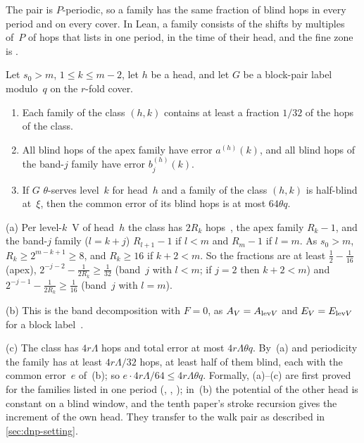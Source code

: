 The pair is $P$-periodic, so a family has the same fraction of blind hops in every period and on every cover. In Lean, a
family consists of the shifts by multiples of~$P$ of hops that  lists in one period, in the time of
their head, and the fine zone is .

\begin{lemma}\label{lem:dnp-family}
Let $s_0>m$, $1\le k\le m-2$, let $h$ be a head, and let $G$ be a block-pair label modulo~$q$ on the $r$-fold cover.
\begin{enumerate}[label=(\alph*)]
\item Each family of the class $(h,k)$ contains at least a fraction $1/32$ of the hops of the class.
\item All blind hops of the apex family have error $a^{(h)}(k)$, and all blind hops of the band-$j$ family have error
  $b^{(h)}_j(k)$.
\item If $G$ $\theta$-serves level~$k$ for head~$h$ and a family of the class $(h,k)$ is half-blind at~$\xi$, then the
  common error of its blind hops is at most $64\theta q$.
\end{enumerate}
\end{lemma}

\begin{outline}
(a) Per level-$k$~V of head~$h$ the class has $2R_k$ hops~\cite[Lemma~5.1(b)]{BoundedNesting2026}, the apex family
$R_k-1$, and the band-$j$ family ($l=k+j$) $R_{l+1}-1$ if $l<m$ and $R_m-1$ if $l=m$. As $s_0>m$, $R_k\ge2^{m-k+1}\ge8$, and
$R_k\ge16$ if $k+2<m$. So the fractions are at least $\frac12-\frac1{16}$ (apex), $2^{-j-2}-\frac1{2R_k}\ge\frac1{32}$
(band~$j$ with $l<m$; if $j=2$ then $k+2<m$) and $2^{-j-1}-\frac1{2R_k}\ge\frac1{16}$ (band~$j$ with $l=m$).

(b) This is the band decomposition with $F=0$, as $A_V=A_{\mathrm{lev} V}$ and $E_V=E_{\mathrm{lev} V}$ for a block
label~\cite[Definition~5.11]{BoundedNesting2026}.

(c) The class has $4r\Lambda$ hops and total error at most $4r\Lambda\theta q$. By~(a) and periodicity the family has at
least $4r\Lambda/32$ hops, at least half of them blind, each with the common error~$e$ of~(b); so
$e\cdot4r\Lambda/64\le4r\Lambda\theta q$.
Formally, (a)--(c) are first proved for the families listed in one period (,
, ); in~(b) the potential of the other
head is constant on a blind window, and the tenth paper's stroke recursion gives the increment of the own head. They
transfer to the walk pair as described in \cref{sec:dnp-setting}.
\end{outline}

